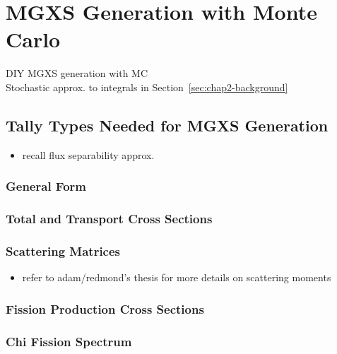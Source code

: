 \section{\ac{MGXS} Generation with Monte Carlo}
\label{sec:chap3-mgxs-gen}

DIY \ac{MGXS} generation with \ac{MC} \\
Stochastic approx. to integrals in Section~\ref{sec:chap2-background} \\


\subsection{Tally Types Needed for \ac{MGXS} Generation}
\label{subsec:chap3-tally-types}

\begin{itemize}[noitemsep]
  \item recall flux separability approx.
\end{itemize}

\subsubsection{General Form}
\label{subsubsec:chap3-gen-xs}

\subsubsection{Total and Transport Cross Sections}
\label{subsubsec:chap3-tot-xs}

\subsubsection{Scattering Matrices}
\label{subsubsec:chap3-scatt-mat}

\begin{itemize}[noitemsep]
  \item refer to adam/redmond's thesis for more details on scattering moments
\end{itemize}

\subsubsection{Fission Production Cross Sections}
\label{subsubsec:chap3-fiss-prod}

\subsubsection{Chi Fission Spectrum}
\label{subsubsec:chap3-chi}


